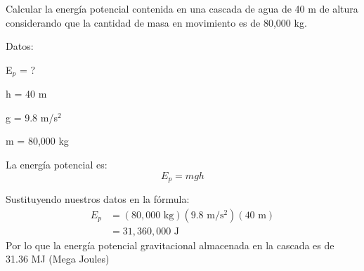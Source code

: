 Calcular la energía potencial contenida en una cascada de agua de 40 m de altura considerando que la cantidad de masa en movimiento es de 80,000 kg.

\begin{solutionbox}{5.5cm}
    \begin{multicols}{2}
        Datos:

        E$_p$ = ?

        h = 40 m

        g = 9.8 m/s$^2$

        m = 80,000 kg

        La energía potencial es:
        \[E_p=mgh\]

        \vspace{2cm}

        Sustituyendo nuestros datos en la fórmula:
        \[
            \begin{array}{rl}
                E_p & = (80,000 \text{ kg})(9.8 \text{ m/s$^2$})(40 \text{ m}) \\[1em]
                    & =31,360,000 \text{ J }
            \end{array}
        \]
        Por lo que la energía potencial gravitacional almacenada en la cascada es de 31.36 MJ (Mega Joules)
    \end{multicols}
\end{solutionbox}
